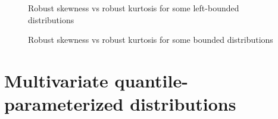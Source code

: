 \documentclass[
]{interact}
\begin{document}
\begin{figure}


\caption{\label{fig-semibounded}Robust skewness vs robust kurtosis for
some left-bounded distributions}

\end{figure}%

\begin{figure}


\caption{\label{fig-bounded}Robust skewness vs robust kurtosis for some
bounded distributions}

\end{figure}%

\section{Multivariate quantile-parameterized
distributions}\label{sec-multivariateqpd}
\end{document}
